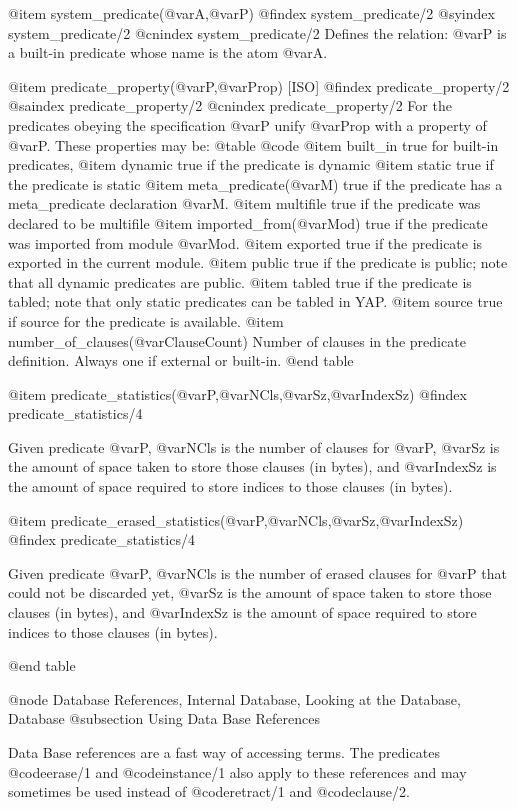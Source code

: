 {{{{{{@item system_predicate(@var{A},@var{P})
@findex system_predicate/2
@syindex system_predicate/2
@cnindex system_predicate/2
Defines the relation:  @var{P} is a built-in predicate whose name
is the atom @var{A}.

@item predicate_property(@var{P},@var{Prop}) [ISO]
@findex predicate_property/2
@saindex predicate_property/2
@cnindex predicate_property/2
For the predicates obeying the specification @var{P} unify @var{Prop}
with a property of @var{P}. These properties may be:
@table @code
@item built_in
true for built-in predicates,
@item dynamic
true if the predicate is dynamic
@item static
true if the predicate is static
@item meta_predicate(@var{M})
true if the predicate has a meta_predicate declaration @var{M}.
@item multifile
true if the predicate was declared to be multifile
@item imported_from(@var{Mod})
true if the predicate was imported from module @var{Mod}.
@item exported
true if the predicate is exported in the current module.
@item public
true if the predicate is public; note that all dynamic predicates are
public.
@item tabled
true if the predicate is tabled; note that only static predicates can
be tabled in YAP.
@item source
true if source for the predicate is available.
@item number_of_clauses(@var{ClauseCount})
Number of clauses in the predicate definition. Always one if external
or built-in.
@end table

@item predicate_statistics(@var{P},@var{NCls},@var{Sz},@var{IndexSz}) 
@findex predicate_statistics/4

Given predicate @var{P}, @var{NCls} is the number of clauses for
@var{P}, @var{Sz} is the amount of space taken to store those clauses
(in bytes), and @var{IndexSz} is the amount of space required to store
indices to those clauses (in bytes).

@item predicate_erased_statistics(@var{P},@var{NCls},@var{Sz},@var{IndexSz}) 
@findex predicate_statistics/4

Given predicate @var{P}, @var{NCls} is the number of erased clauses for
@var{P} that could not be discarded yet, @var{Sz} is the amount of space
taken to store those clauses (in bytes), and @var{IndexSz} is the amount
of space required to store indices to those clauses (in bytes).

@end table

@node Database References, Internal Database, Looking at the Database, Database
@subsection Using Data Base References

Data Base references are a fast way of accessing terms. The predicates
@code{erase/1} and @code{instance/1} also apply to these references and may
sometimes be used instead of @code{retract/1} and @code{clause/2}.

}}}}}}
